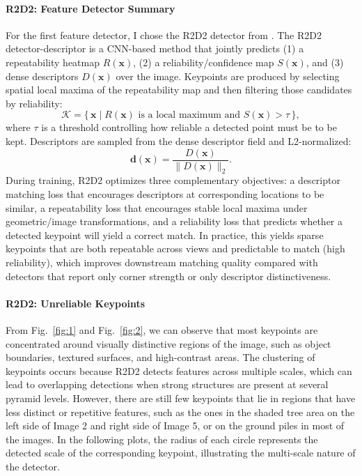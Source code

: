 \documentclass{rapport}
\begin{document}
\paragraph{R2D2: Feature Detector Summary}
For the first feature detector, I chose the R2D2 detector from \cite{r2d2}. The R2D2 detector-descriptor is a CNN-based method that jointly predicts (1) a repeatability heatmap \(R(\mathbf{x})\), (2) a 
reliability/confidence map \(S(\mathbf{x})\), and (3) dense descriptors \(D(\mathbf{x})\) over the image. Keypoints are produced 
by selecting spatial local maxima of the repeatability map and then filtering those candidates by reliability:
\[
\mathcal{K} = \{\,\mathbf{x} \mid R(\mathbf{x}) \text{ is a local maximum and } S(\mathbf{x})>\tau\,\},
\]
where \(\tau\) is a threshold controlling how reliable a detected point must be to be kept. Descriptors are sampled from the dense 
descriptor field and L2-normalized:
\[
\mathbf{d}(\mathbf{x}) = \frac{D(\mathbf{x})}{\lVert D(\mathbf{x})\rVert_2}.
\]
During training, R2D2 optimizes three complementary objectives: a descriptor matching loss that encourages descriptors at corresponding 
locations to be similar, a repeatability loss that encourages stable local maxima under geometric/image transformations, and a 
reliability loss that predicts whether a detected keypoint will yield a correct match. In practice, this yields sparse keypoints 
that are both repeatable across views and predictable to match (high reliability), which improves downstream matching quality compared 
with detectors that report only corner strength or only descriptor distinctiveness.

\paragraph{R2D2: Unreliable Keypoints}
From Fig.~\ref{fig:1} and Fig.~\ref{fig:2}, we can observe that most keypoints are 
concentrated around visually distinctive regions of the image, such as object boundaries, 
textured surfaces, and high-contrast areas. The clustering of keypoints occurs because R2D2 
detects features across multiple scales, which can lead to overlapping detections when strong 
structures are present at several pyramid levels. However, there are still few keypoints that lie in regions that have less distinct or repetitive features, such as the ones
in the shaded tree area on the left side of Image 2 and right side of Image 5, or on the ground piles in most of the images.
In the following plots, the radius of 
each circle represents the detected scale of the corresponding keypoint, illustrating the multi-scale 
nature of the detector.
\end{document}
